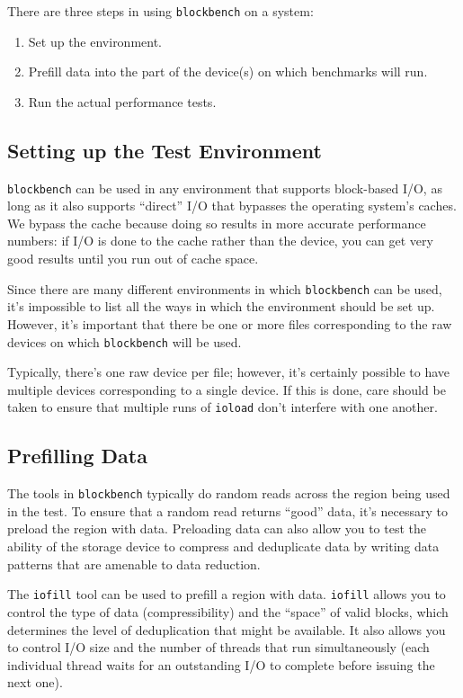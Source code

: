 \documentclass[letterpaper,11pt]{article}
\newcommand{\blockbench}{\texttt{blockbench}\xspace}
\newcommand{\ioload}{\texttt{ioload}\xspace}
\newcommand{\iofill}{\texttt{iofill}\xspace}
\begin{document}
There are three steps in using \blockbench on a system:
\begin{enumerate}
\item Set up the environment.
\item Prefill data into the part of the device(s) on which benchmarks will run.
\item Run the actual performance tests.
\end{enumerate}

\subsection{Setting up the Test Environment}

\blockbench can be used in any environment that supports block-based I/O, as long as it
also supports ``direct'' I/O that bypasses the operating system's caches.  We bypass the
cache because doing so results in more accurate performance numbers: if I/O is done to the
cache rather than the device, you can get very good results until you run out of cache
space.

Since there are many different environments in which \blockbench can be used, it's impossible
to list all the ways in which the environment should be set up.  However, it's important that
there be one or more files corresponding to the raw devices on which \blockbench will be
used.

Typically, there's one raw device per file; however, it's certainly possible to have
multiple devices corresponding to a single device.  If this is done, care should be taken
to ensure that multiple runs of \ioload don't interfere with one another.

\subsection{Prefilling Data}
\label{sec:prefill}

The tools in \blockbench typically do random reads across the region being used in the
test.  To ensure that a random read returns ``good'' data, it's necessary to preload the
region with data.  Preloading data can also allow you to test the ability of the storage
device to compress and deduplicate data by writing data patterns that are amenable to data
reduction.

The \iofill tool can be used to prefill a region with data.  \iofill allows you to control
the type of data (compressibility) and the ``space'' of valid blocks, which determines the
level of deduplication that might be available.  It also allows you to control I/O size
and the number of threads that run simultaneously (each individual thread waits for an
outstanding I/O to complete before issuing the next one).
\end{document}
